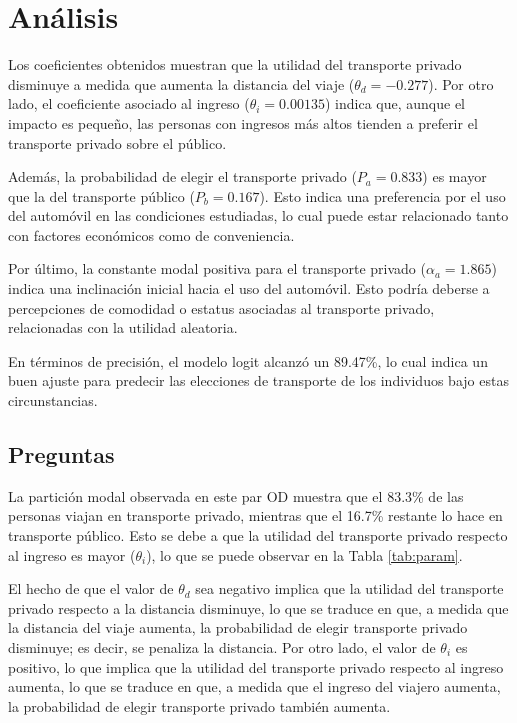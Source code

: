 \section{Análisis}

Los coeficientes obtenidos muestran que la utilidad del transporte privado disminuye a medida que aumenta la distancia del viaje ($\theta_d = -0.277$). Por otro lado, el coeficiente asociado al ingreso ($\theta_i = 0.00135$) indica que, aunque el impacto es pequeño, las personas con ingresos más altos tienden a preferir el transporte privado sobre el público.

Además, la probabilidad de elegir el transporte privado ($P_a = 0.833$) es mayor que la del transporte público ($P_b = 0.167$). Esto indica una preferencia por el uso del automóvil en las condiciones estudiadas, lo cual puede estar relacionado tanto con factores económicos como de conveniencia.

Por último, la constante modal positiva para el transporte privado ($\alpha_a = 1.865$) indica una inclinación inicial hacia el uso del automóvil. Esto podría deberse a percepciones de comodidad o estatus asociadas al transporte privado, relacionadas con la utilidad aleatoria.

En términos de precisión, el modelo logit alcanzó un 89.47\%, lo cual indica un buen ajuste para predecir las elecciones de transporte de los individuos bajo estas circunstancias.

\subsection{Preguntas}

La partición modal observada en este par OD muestra que el 83.3\% de las personas viajan en transporte privado, mientras que el 16.7\% restante lo hace en transporte público. Esto se debe a que la utilidad del transporte privado respecto al ingreso es mayor ($\theta_{i}$), lo que se puede observar en la Tabla \ref{tab:param}.

El hecho de que el valor de $\theta_{d}$ sea negativo implica que la utilidad del transporte privado respecto a la distancia disminuye, lo que se traduce en que, a medida que la distancia del viaje aumenta, la probabilidad de elegir transporte privado disminuye; es decir, se penaliza la distancia. Por otro lado, el valor de $\theta_{i}$ es positivo, lo que implica que la utilidad del transporte privado respecto al ingreso aumenta, lo que se traduce en que, a medida que el ingreso del viajero aumenta, la probabilidad de elegir transporte privado también aumenta.

